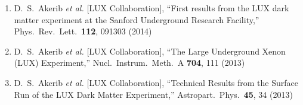 \documentclass[a4paper,10pt]{article}
\begin{document}
\begin{enumerate}
\item   D.~S.~Akerib {\it et al.} [LUX Collaboration],
  ``First results from the LUX dark matter experiment at the Sanford Underground Research Facility,''
  Phys.\ Rev.\ Lett.\  {\bf 112}, 091303 (2014)

\item   D.~S.~Akerib {\it et al.} [LUX Collaboration],
  ``The Large Underground Xenon (LUX) Experiment,''
  Nucl.\ Instrum.\ Meth.\ A {\bf 704}, 111 (2013)
 
\item   D.~S.~Akerib {\it et al.} [LUX Collaboration],
  ``Technical Results from the Surface Run of the LUX Dark Matter Experiment,''
  Astropart.\ Phys.\  {\bf 45}, 34 (2013)
 
\end{enumerate}



\end{document}
